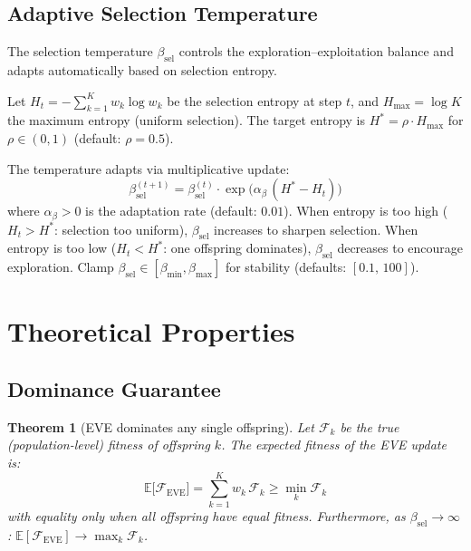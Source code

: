 \documentclass[12pt]{article}
\newcommand{\eqbox}[2]{%
  \begin{tcolorbox}[eqstyle, title={#1}]
    #2
  \end{tcolorbox}
}
\newtheorem{theorem}{Theorem}
\newcommand{\E}{\mathbb{E}}
\begin{document}
\subsection{Adaptive Selection Temperature}
\label{ssec:temperature}

The selection temperature $\beta_{\mathrm{sel}}$ controls the
exploration--exploitation balance and adapts automatically based on
selection entropy.

\eqbox{Definition 6 \textemdash\ Adaptive Selection Temperature}{
Let $H_t = -\sum_{k=1}^K w_k \log w_k$ be the selection entropy
at step $t$, and $H_{\max} = \log K$ the maximum entropy (uniform
selection).
The target entropy is $H^* = \rho \cdot H_{\max}$ for
$\rho \in (0, 1)$ (default: $\rho = 0.5$).

The temperature adapts via multiplicative update:
\begin{equation}
  \beta_{\mathrm{sel}}^{(t+1)} = \beta_{\mathrm{sel}}^{(t)} \cdot
    \exp\!\bigl(\alpha_\beta\,(H^* - H_t)\bigr)
  \label{eq:temperature_adapt}
\end{equation}
\smallskip
where $\alpha_\beta > 0$ is the adaptation rate (default: $0.01$).
When entropy is too high ($H_t > H^*$: selection too uniform),
$\beta_{\mathrm{sel}}$ increases to sharpen selection.
When entropy is too low ($H_t < H^*$: one offspring dominates),
$\beta_{\mathrm{sel}}$ decreases to encourage exploration.
Clamp $\beta_{\mathrm{sel}} \in [\beta_{\min}, \beta_{\max}]$ for
stability (defaults: $[0.1,\, 100]$).
}


\section{Theoretical Properties}
\label{sec:theory}

\subsection{Dominance Guarantee}

\begin{theorem}[EVE dominates any single offspring]
\label{thm:dominance}
Let $\mathcal{F}_k$ be the true (population-level) fitness of offspring
$k$.
The expected fitness of the EVE update is:
\begin{equation}
  \E\bigl[\mathcal{F}_{\mathrm{EVE}}\bigr]
  = \sum_{k=1}^K w_k\,\mathcal{F}_k
  \geq \min_{k} \mathcal{F}_k
  \label{eq:dominance}
\end{equation}
with equality only when all offspring have equal fitness.
Furthermore, as $\beta_{\mathrm{sel}} \to \infty$:
$\E[\mathcal{F}_{\mathrm{EVE}}] \to \max_k \mathcal{F}_k$.
\end{theorem}
\end{document}
